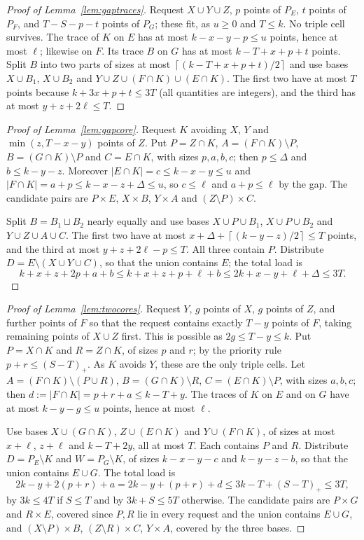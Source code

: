 \documentclass[11pt]{article}
\numberwithin{equation}{section}
\theoremstyle{definition}
\theoremstyle{remark}
\newcommand{\ceil}[1]{\left\lceil #1\right\rceil}
\begin{document}
\begin{proof}[Proof of Lemma~\ref{lem:gaptraces}]
Request $X\cup Y\cup Z$, $p$ points of $P_E$, $t$ points of $P_F$, and
$T-S-p-t$ points of $P_G$; these fit, as $u\ge0$ and $T\le k$. No
triple cell survives. The trace of $K$ on $E$ has at most
$k-x-y-p\le u$ points, hence at most $\ell$; likewise on $F$. Its trace
$B$ on $G$ has at most $k-T+x+p+t$ points. Split $B$ into two parts of
sizes at most $\ceil{(k-T+x+p+t)/2}$ and use bases $X\cup B_1$,
$X\cup B_2$ and $Y\cup Z\cup(F\cap K)\cup(E\cap K)$. The first two have
at most $T$ points because $k+3x+p+t\le3T$ (all quantities are
integers), and the third has at most $y+z+2\ell\le T$.
\end{proof}

\begin{proof}[Proof of Lemma~\ref{lem:gapcore}]
Request $K$ avoiding $X$, $Y$ and $\min(z,T-x-y)$ points of $Z$. Put
$P=Z\cap K$, $A=(F\cap K)\setminus P$, $B=(G\cap K)\setminus P$ and
$C=E\cap K$, with sizes $p,a,b,c$; then $p\le\Delta$ and $b\le k-y-z$.
Moreover $|E\cap K|=c\le k-x-y\le u$ and
$|F\cap K|=a+p\le k-x-z+\Delta\le u$, so $c\le\ell$ and $a+p\le\ell$ by the gap.
The candidate pairs are $P\times E$, $X\times B$, $Y\times A$ and
$(Z\setminus P)\times C$.

Split $B=B_1\sqcup B_2$ nearly equally and use bases $X\cup P\cup B_1$,
$X\cup P\cup B_2$ and $Y\cup Z\cup A\cup C$. The first two have at most
$x+\Delta+\ceil{(k-y-z)/2}\le T$ points, and the third at most
$y+z+2\ell-p\le T$. All three contain $P$. Distribute
$D=E\setminus(X\cup Y\cup C)$, so that the union contains $E$; the total
load is
\[
 k+x+z+2p+a+b\le k+x+z+p+\ell+b\le2k+x-y+\ell+\Delta\le3T .
\]
\end{proof}

\begin{proof}[Proof of Lemma~\ref{lem:twocores}]
Request $Y$, $g$ points of $X$, $g$ points of $Z$, and further points of
$F$ so that the request contains exactly $T-y$ points of $F$, taking
remaining points of $X\cup Z$ first. This is possible as
$2g\le T-y\le k$. Put $P=X\cap K$ and $R=Z\cap K$, of sizes $p$ and $r$;
by the priority rule $p+r\le(S-T)_+$. As $K$ avoids $Y$, these are the
only triple cells. Let $A=(F\cap K)\setminus(P\cup R)$,
$B=(G\cap K)\setminus R$, $C=(E\cap K)\setminus P$, with sizes $a,b,c$;
then $d:=|F\cap K|=p+r+a\le k-T+y$. The traces of $K$ on $E$ and on $G$
have at most $k-y-g\le u$ points, hence at most $\ell$.

Use bases $X\cup(G\cap K)$, $Z\cup(E\cap K)$ and $Y\cup(F\cap K)$, of
sizes at most $x+\ell$, $z+\ell$ and $k-T+2y$, all at most $T$. Each
contains $P$ and $R$. Distribute $D=P_E\setminus K$ and
$W=P_G\setminus K$, of sizes $k-x-y-c$ and $k-y-z-b$, so that the union
contains $E\cup G$. The total load is
\[
 2k-y+2(p+r)+a=2k-y+(p+r)+d\le3k-T+(S-T)_+\le3T,
\]
by $3k\le4T$ if $S\le T$ and by $3k+S\le5T$ otherwise. The candidate pairs
are $P\times G$ and $R\times E$, covered since $P,R$ lie in every request
and the union contains $E\cup G$, and $(X\setminus P)\times B$,
$(Z\setminus R)\times C$, $Y\times A$, covered by the three bases.
\end{proof}
\end{document}
